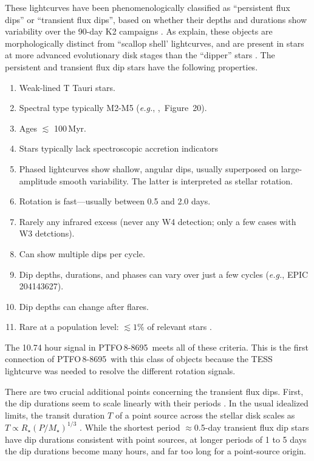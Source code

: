 \documentclass[12pt,twocolumn,tighten]{aastex62}
\newcommand{\ptfo}{PTFO$\,$8-8695}
\begin{document}
These lightcurves have been phenomenologically classified as
``persistent flux dips'' or ``transient flux dips'', based on whether
their depths and durations show variability over the 90-day K2
campaigns \citep{stauffer_orbiting_2017}.
As \citet{stauffer_orbiting_2017} explain,
these  objects are morphologically distinct from ``scallop shell' lightcurves,
and are present in stars at more advanced evolutionary disk stages than
the ``dipper'' stars \citep{ansdell_young_2016,cody_manyfaceted_2018}.
The persistent and transient flux dip stars have the following properties.
\begin{enumerate}[topsep=0.5ex,itemsep=-0.5ex,partopsep=1ex,parsep=1.5ex]
  \item Weak-lined T Tauri stars.
  \item Spectral type typically M2-M5 ({\it e.g.},
    \citealt{rebull_usco_2018},~Figure~20).
  \item Ages $\lesssim$ 100$\,$Myr.
  \item Stars typically lack spectroscopic accretion indicators 
  \item Phased lightcurves show shallow, angular dips, usually
    superposed on large-amplitude smooth variability. The latter
    is interpreted as stellar rotation.
  \item Rotation is fast---usually between 0.5 and 2.0 days.
  \item Rarely any infrared excess (never any W4 detection; only a few
    cases with W3 detctions).
  \item Can show multiple dips per cycle.
  \item Dip depths, durations, and phases can vary over just a few cycles
    ({\it e.g.}, EPIC 204143627).
  \item Dip depths can change after flares.
  \item Rare at a population level: $\lesssim 1\%$ of relevant stars
    \citep{rebull_usco_2018}.
\end{enumerate}
The 10.74 hour signal in \ptfo\ meets all of these criteria.
This is the first connection of \ptfo\ with this class of objects
because the TESS lightcurve was needed to resolve the different
rotation signals.

There are two crucial additional points concerning the transient flux
dips.  First, the dip durations seem to scale linearly with their
periods \citep[][Figure~26]{stauffer_orbiting_2017}.  In the usual
idealized limits, the transit duration $T$ of a point source across
the stellar disk scales as $T \propto R_\star (P/M_\star)^{1/3}$
\citep{winn_exoplanet_2010}.  While the shortest period
$\approx$0.5-day transient flux dip stars have dip durations
consistent with point sources, at longer periods of 1 to 5 days the
dip durations become many hours, and far too long for a point-source
origin.
\end{document}
